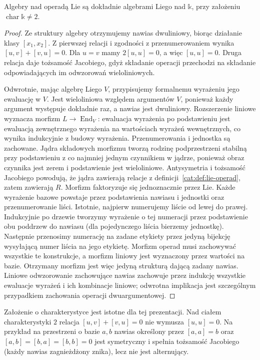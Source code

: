\begin{twierdzenie}\label{cat:thm:lie-operad-algebras}
Algebry nad operadą $\mathrm{Lie}$ są dokładnie algebrami Liego nad $\mathbb k$, przy założeniu $\operatorname{char}\mathbb k\ne2$.
\end{twierdzenie}
\begin{proof}
Ze struktury algebry otrzymujemy nawias dwuliniowy, biorąc działanie klasy $[x_1,x_2]$. Z pierwszej relacji i zgodności z przenumerowaniem wynika $[u,v]+[v,u]=0$. Dla $u=v$ mamy $2[u,u]=0$, a więc $[u,u]=0$. Druga relacja daje tożsamość Jacobiego, gdyż składanie operacji przechodzi na składanie odpowiadających im odwzorowań wieloliniowych.

Odwrotnie, mając algebrę Liego $V$, przypisujemy formalnemu wyrażeniu jego ewaluację w $V$. Jest wieloliniowa względem argumentów $V$, ponieważ każdy argument występuje dokładnie raz, a nawias jest dwuliniowy. Rozszerzenie liniowe wyznacza morfizm $L\to\operatorname{End}_V$: ewaluacja wyrażenia po podstawieniu jest ewaluacją zewnętrznego wyrażenia na wartościach wyrażeń wewnętrznych, co wynika indukcyjnie z budowy wyrażenia. Przenumerowania i jednostka są zachowane. Jądra składowych morfizmu tworzą rodzinę podprzestrzeni stabilną przy podstawieniu z co najmniej jednym czynnikiem w jądrze, ponieważ obraz czynnika jest zerem i podstawienie jest wieloliniowe. Antysymetria i tożsamość Jacobiego powodują, że jądra zawierają relacje z definicji~\ref{cat:def:lie-operad}, zatem zawierają $R$. Morfizm faktoryzuje się jednoznacznie przez $\mathrm{Lie}$. Każde wyrażenie bazowe powstaje przez podstawienia nawiasu i jednostki oraz przenumerowanie liści. Istotnie, najpierw numerujemy liście od lewej do prawej. Indukcyjnie po drzewie tworzymy wyrażenie o tej numeracji przez podstawienie obu poddrzew do nawiasu (dla pojedynczego liścia bierzemy jednostkę). Następnie przenosimy numerację na zadane etykiety przez jedyną bijekcję wysyłającą numer liścia na jego etykietę. Morfizm operad musi zachowywać wszystkie te konstrukcje, a morfizm liniowy jest wyznaczony przez wartości na bazie. Otrzymany morfizm jest więc jedyną strukturą dającą zadany nawias. Liniowe odwzorowanie zachowujące nawias zachowuje przez indukcję wszystkie ewaluacje wyrażeń i ich kombinacje liniowe; odwrotna implikacja jest szczególnym przypadkiem zachowania operacji dwuargumentowej.
\end{proof}
Założenie o charakterystyce jest istotne dla tej prezentacji. Nad ciałem charakterystyki $2$ relacja $[u,v]+[v,u]=0$ nie wymusza $[u,u]=0$. Na przykład na przestrzeni o bazie $a,b$ nawias określony przez $[a,a]=b$ oraz $[a,b]=[b,a]=[b,b]=0$ jest symetryczny i spełnia tożsamość Jacobiego (każdy nawias zagnieżdżony znika), lecz nie jest alternujący.

